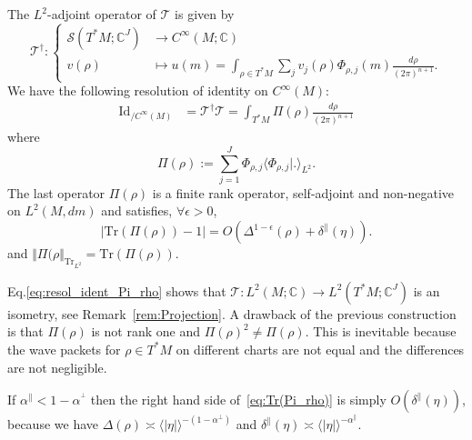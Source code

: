 \documentclass[AHL,Unicode,longabstracts,published]{cedram}
\newcommand{\clS}{\mathcal{S}}
\newcommand{\clT}{\mathcal{T}}
\newcommand{\Id}{\mathrm{Id}}
\newcommand{\Tr}{\mathrm{Tr}}
\newcommand{\bbC}{\mathbb{C}}
\let\oldforall\forall
\renewcommand*{\forall}{\mathrel{\oldforall}}
\begin{document}
\begin{cBoxB}{}
\begin{prop}\label{prop:resolution_identity_CM}
The $L^{2}$-adjoint operator of $\clT$ is given by
\begin{equation}\label{eq:def_T_*}
\clT^{\dagger}:
\begin{cases}
\clS\left(T^{*}M;\bbC^{J}\right) & \rightarrow C^{\infty}\left(M;\bbC\right)\\
v\left(\rho\right) & \mapsto u\left(m\right)=\int_{\rho\in T^{*}M}\sum_{j}v_{j}\left(\rho\right)\Phi_{\rho,j}\left(m\right)\frac{d\rho}{\left(2\pi\right)^{n+1}}.
\end{cases}
\end{equation}
We have the following resolution of identity on $C^{\infty}\left(M\right)$:
\begin{align}\label{eq:resol_ident_Pi_rho}
\Id _{/C^{\infty}\left(M\right)} & =\clT^{\dagger}\clT=\int_{T^{*}M}\Pi\left(\rho\right)\frac{d\rho}{\left(2\pi\right)^{n+1}}
\end{align}
where
\begin{equation}\label{eq:Pi_(rho)}
\Pi\left(\rho\right):=\sum_{j=1}^{J}\Phi_{\rho,j}\langle\Phi_{\rho,j}|.\rangle_{L^{2}}.
\end{equation}
The last operator $\Pi(\rho)$ is a finite rank operator, self-adjoint and non-negative on $L^{2}(M,dm)$ and satisfies, $\forall\epsilon>0$,
\begin{equation}\label{eq:Tr(Pi_rho)}
\left|\Tr\left(\Pi\left(\rho\right)\right)-1\right|=O\left(\Delta^{1-\epsilon}\left(\rho\right)+\delta^{\parallel}\left(\eta\right)\right).
\end{equation}
and $\Vert \Pi(\rho\Vert _{\Tr_{L^{2}}}=\Tr(\Pi(\rho))$.
\end{prop}
\end{cBoxB}

\begin{rema}
Eq.\eqref{eq:resol_ident_Pi_rho} shows that $\clT:L^{2}(M;\bbC)\rightarrow L^{2}(T^{*}M;\bbC^{J})$ is an isometry, see Remark~\ref{rem:Projection}. A drawback of the previous construction is that $\Pi(\rho)$ is not rank one and $\Pi(\rho)^{2}\neq\Pi(\rho)$. This is inevitable because the wave packets for $\rho\in T^{*}M$ on different charts are not equal and the differences are not negligible.
\end{rema}


\begin{rema}
If $\alpha^{\parallel}<1-\alpha^{^{\perp}}$ then the right hand side of~\eqref{eq:Tr(Pi_rho)} is simply $O(\delta^{\parallel}(\eta))$, because we have $\Delta(\rho)\asymp\langle |\eta|\rangle^{-(1-\alpha^{\perp})}$ and $\delta^{\parallel}(\eta)\asymp\langle |\eta|\rangle ^{-\alpha^{\parallel}}$.
\end{rema}
\end{document}
